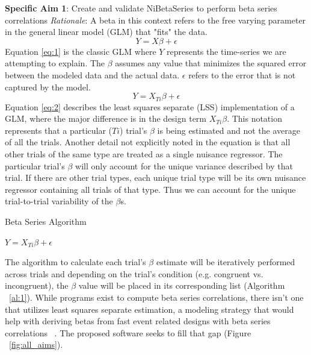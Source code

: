 \documentclass[phd,appendix,figures]{uithesis}
\begin{document}
\textbf{Specific Aim 1}: Create and validate NiBetaSeries to perform beta series correlations
\newline
\newline
\textit{Rationale}: A beta in this context refers to the free varying parameter in the general linear model (GLM) that "fits" the data.
\begin{equation}
	Y = X\beta + \epsilon 
	\label{eq:1}
\end{equation}
Equation \ref{eq:1} is the classic GLM where $Y$ represents the time-series we are attempting to explain.
The $\beta$ assumes any value that minimizes the squared error between the modeled data and the actual data. 
$\epsilon$ refers to the error that is not captured by the model.
\begin{equation} \label{eq:2}
Y = X_{Ti}\beta + \epsilon
\end{equation}
Equation \ref{eq:2} describes the least squares separate (LSS) implementation of a GLM, where the major difference is in the design term $X_{Ti}\beta$.
This notation represents that a particular ($Ti$) trial's $\beta$ is being estimated and not the average of all the trials.
Another detail not explicitly noted in the equation is that all other trials of the same type are treated as a single nuisance regressor.
The particular trial's $\beta$ will only account for the unique variance described by that trial.
If there are other trial types, each unique trial type will be its own nuisance regressor containing all trials of that type.
Thus we can account for the unique trial-to-trial variability of the $\beta$s.
\begin{algorithm}
	\caption{Beta Series Algorithm}\label{al:1}
	\begin{algorithmic}[1]
    		\STATE \texttt{$Y = X_{Ti}\beta + \epsilon$}
		\ENDFOR
	\end{algorithmic}
\end{algorithm}
The algorithm to calculate each trial's $\beta$ estimate will be iteratively performed across trials and depending on the trial's condition (e.g. congruent vs. incongruent), the $\beta$ value will be placed in its corresponding list (Algorithm ~\ref{al:1}).
While programs exist to compute beta series correlations, there isn't one that utilizes least squares separate estimation, a modeling strategy that would help with deriving betas from fast event related designs with beta series correlations ~\citep{Mumford2012,Gottlich2015}. 
The proposed software seeks to fill that gap (Figure ~\ref{fig:all_aims}).
\end{document}
